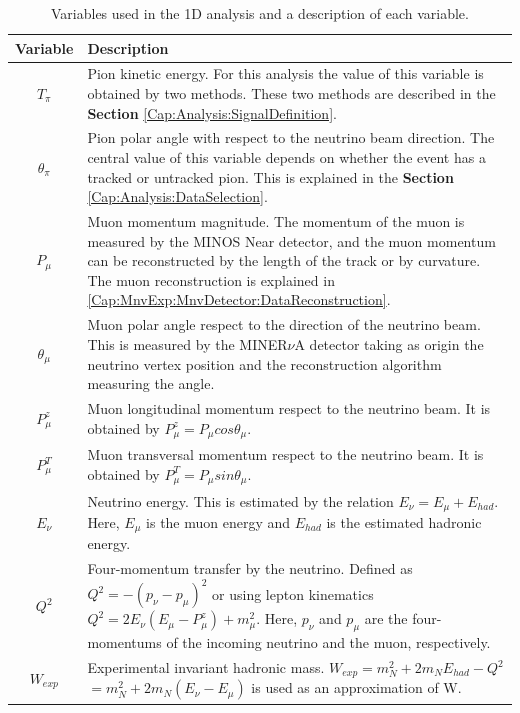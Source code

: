 \begin{table}[!htb]
    \centering
    \begin{tabular}{c|p{4.6in}}
        \hline
        Variable & Description \\ \hline
        $T_\pi$      & Pion kinetic energy. For this analysis the value of this variable is  obtained by two methods. These two methods are described in the \textbf{Section} \ref{Cap:Analysis:SignalDefinition}. \\ 
        \hline
        $\theta_\pi$ & Pion polar angle with respect to the neutrino beam direction. The central value of this variable depends on whether the event has a tracked or untracked pion. This is explained in the \textbf{Section} \ref{Cap:Analysis:DataSelection}. \\
        \hline
        $P_\mu$      & Muon momentum magnitude. The momentum of the muon is measured by the MINOS Near detector, and the muon momentum can be reconstructed by the length of the track or by curvature. The muon reconstruction is explained in \ref{Cap:MnvExp:MnvDetector:DataReconstruction}. \\
        \hline
        $\theta_\mu$ & Muon polar angle respect to the direction of the neutrino beam. This is measured by the MINER$\nu$A detector taking as origin the neutrino vertex position and the reconstruction algorithm measuring the angle.\\
        \hline
        $P^z_\mu$    & Muon longitudinal momentum respect to the neutrino beam. It is obtained by $P^z_\mu = P_\mu cos \theta_\mu$. \\
        \hline
        $P^T_\mu$    & Muon transversal momentum respect to the neutrino beam. It is obtained by $P^T_\mu = P_\mu sin \theta_\mu$. \\
        \hline
        $E_\nu$      & Neutrino energy. This is estimated by the relation $E_\nu = E_\mu + E_{had}$. Here, $E_\mu$ is the muon energy and $E_{had}$ is the estimated hadronic energy. \\
        \hline
        $Q^2$        & Four-momentum transfer by the neutrino. Defined as $Q^2 = - (p_\nu -p_\mu)^2$ or using lepton kinematics $Q^2 = 2E_\nu(E_\mu-P^z_\mu) + m^2_\mu$. Here, $p_\nu$ and $p_\mu$ are the four-momentums of the incoming neutrino and the muon, respectively.\\ 
        \hline
        $W_{exp}$    & Experimental invariant hadronic mass. $W_{exp} = m^2_N + 2m_NE_{had} - Q^2$ $= m^2_N + 2m_N(E_\nu-E_\mu)$ is used as an approximation of W.\\
        \hline
    \end{tabular}
    \caption{Variables used in the 1D analysis and a description of each variable.}
    \label{tab:Analisys:AnaVariables:1Danalysis}
\end{table}

